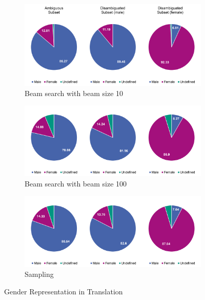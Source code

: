 \begin{figure}[!htb]
     \centering
     
     \begin{subfigure}{\textwidth}
         \centering
         \includegraphics[width=\textwidth]{figures/gender/beam_10.png}
         \caption{Beam search with beam size 10}
         \label{fig:gender_10}
     \end{subfigure}
     
     \begin{subfigure}{\textwidth}
         \centering
         \includegraphics[width=\textwidth]{figures/gender/beam_100.png}
         \caption{Beam search with beam size 100}
         \label{fig:gender_100}
     \end{subfigure}

     \begin{subfigure}{\textwidth}
         \centering
         \includegraphics[width=\textwidth]{figures/gender/sampling.png}
         \caption{Sampling}
         \label{fig:sampling}
     \end{subfigure}
     
    \caption{Gender Representation in Translation}
    \label{fig:gender_pie_10}
\end{figure}

